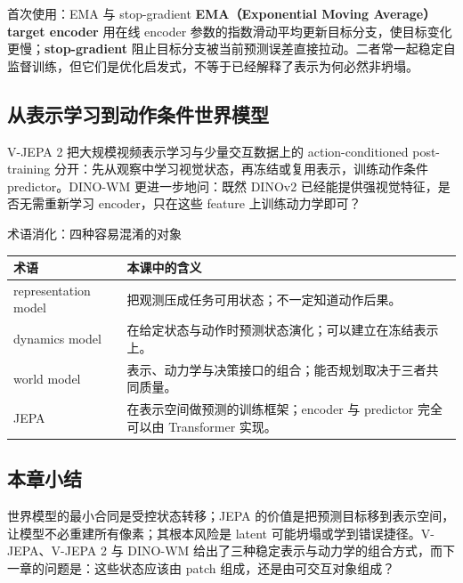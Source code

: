 

\begin{knowledgebox}{首次使用：EMA 与 stop-gradient}
\textbf{EMA（Exponential Moving Average）target encoder} 用在线 encoder 参数的指数滑动平均更新目标分支，使目标变化更慢；\textbf{stop-gradient} 阻止目标分支被当前预测误差直接拉动。二者常一起稳定自监督训练，但它们是优化启发式，不等于已经解释了表示为何必然非坍塌。
\end{knowledgebox}

\subsection{从表示学习到动作条件世界模型}

V-JEPA 2 把大规模视频表示学习与少量交互数据上的 action-conditioned post-training 分开：先从观察中学习视觉状态，再冻结或复用表示，训练动作条件 predictor。DINO-WM 更进一步地问：既然 DINOv2 已经能提供强视觉特征，是否无需重新学习 encoder，只在这些 feature 上训练动力学即可？




\begin{knowledgebox}{术语消化：四种容易混淆的对象}
\begin{tabularx}{\textwidth}{L{0.20\textwidth} X}
\toprule
术语 & 本课中的含义 \\
\midrule
representation model & 把观测压成任务可用状态；不一定知道动作后果。 \\
dynamics model & 在给定状态与动作时预测状态演化；可以建立在冻结表示上。 \\
world model & 表示、动力学与决策接口的组合；能否规划取决于三者共同质量。 \\
JEPA & 在表示空间做预测的训练框架；encoder 与 predictor 完全可以由 Transformer 实现。 \\
\bottomrule
\end{tabularx}
\end{knowledgebox}

\subsection{本章小结}

世界模型的最小合同是受控状态转移；JEPA 的价值是把预测目标移到表示空间，让模型不必重建所有像素；其根本风险是 latent 可能坍塌或学到错误捷径。V-JEPA、V-JEPA 2 与 DINO-WM 给出了三种稳定表示与动力学的组合方式，而下一章的问题是：这些状态应该由 patch 组成，还是由可交互对象组成？


